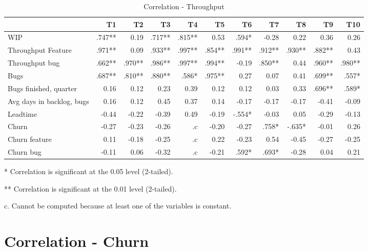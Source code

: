\documentclass[UKenglish]{ifimaster}  %
\begin{document}
\begin{table}[!htbp]
 \begin{adjustwidth}{-1cm}{}
 \centering
 \begin{tabular}{|l|r|r|r|r|r|r|r|r|r|r|}
\hline
 & T1 & T2 & T3 & T4 & T5 & T6 & T7 & T8 & T9 & T10\\ \hline
WIP &.747**& 0.19& .717**& .815**& 0.53& .594*& -0.28& 0.22& 0.36& 0.26\\ \hline
Throughput Feature &.971**& 0.09& .933**& .997**& .854**& .991**& .912**& .930**& .882**& 0.43\\ \hline
Throughput bug &.662**& .970**& .986**& .997**& .994**& -0.19& .850**& 0.44& .960**& .980**\\ \hline
Bugs &.687**& .810**& .880**& .586*& .975**& 0.27& 0.07& 0.41& .699**& .557*\\ \hline
Bugs finished, quarter &0.16& 0.12& 0.23& 0.39& 0.12& 0.12& 0.03& 0.33& .696**& .589*\\ \hline
Avg days in backlog, bugs &0.16& 0.12& 0.45& 0.37& 0.14& -0.17& -0.17& -0.17& -0.41& -0.09\\ \hline
Leadtime &-0.44& -0.22& -0.39& 0.49& -0.19& -.554*& -0.03& 0.05& -0.29& -0.13\\ \hline
Churn &-0.27& -0.23& -0.26& .c& -0.20& -0.27& .758*& -.635*& -0.01& 0.26\\ \hline
Churn feature &0.11& -0.18& -0.25& .c& 0.22& -0.23& 0.54& -0.45& -0.27& -0.25\\ \hline
Churn bug &-0.11& 0.06& -0.32& .c
& -0.21& .592*
& .693*
& -0.28& 0.04& 0.21\\ \hline
\end{tabular}
 \caption{Correlation - Throughput}
 \label{corr:TP}
 \centerline {* Correlation is significant at the 0.05 level (2-tailed).}
\centerline{** Correlation is significant at the 0.01 level (2-tailed).}
\centerline{c. Cannot be computed because at least one of the variables is constant.}
\end{adjustwidth}
\end{table}

\section{Correlation - Churn}
\label{sec:corr:churn}
\end{document}
